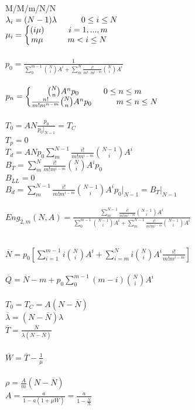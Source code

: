 \begin{minipage}{.22\textwidth}
	M/M/m/N/N \\
	$\lambda_i=(N-1)\lambda \hskip 3em 0\le{i}\le{N}$ \\
	$\mu_i = \left \{  \begin{matrix} (i\mu) \hskip 3em  i=1,...,m \\
			m\mu \hskip 3em m<i\le{N}\end{matrix}  \right .$ \\ \\
	$p_0=\frac{1}{\sum_0^{m-1}\binom{N}{i}A^i+\sum_m^N\frac{i!}{m!\cdot{m^{i-m}}}{\binom{N}{i}A^i}}$ \\ \\
	$p_n = \left \{  \begin{matrix} \binom{N}{n}A^n{p_0} \hskip 3em  0 \le {n} \le {m} \\
			\frac{n!}{m!m^{n-m}}\binom{N}{n}A^n{p_0} \hskip 3em m\le{n}\le{N}\end{matrix}  \right .$ \\ \\
	$T_0=AN\frac{p_0}{p_0|_{N-1}}=T_C$ \\
	$T_p=0$ \\
	$T_d=ANp_0\sum\limits_m^{N-1}\frac{i!}{m!{m^{i-m}}}\binom{N-1}{i}A^i$ \\
	$B_T=\sum\limits_m^{N}\frac{i!}{m!{m^{i-m}}}\binom{N}{i}A^i{p_0}$ \\
	$B_{LL}=0$ \\
	$B_d=\sum\limits_m^{N-1}\frac{i!}{m!{m^{i-m}}}\binom{N-1}{i}A^i{p_0|_{N-1}}=B_T|_{N-1}$\\ \\
	$Eng_{2,m}(N,A)=\frac{\sum\limits_m^{N-1}\frac{i!}{m!{m^{i-m}}}\binom{N-1}{i}A^i}{\sum\limits_0^{m-1}\binom{N-1}{i}A^i +\sum\limits_m^{N-1}\frac{i!}{m!{m^{i-m}}}\binom{N-1}{i}A^i}$ \\ \\
\end{minipage}
\vfill\null
\columnbreak
\begin{minipage}{.22\textwidth}
	$\overline{N}=p_0[\sum\limits_{i=1}^{m-1}{i}\binom{N}{i}A^i+\sum\limits_{i=m}^{N}{i}\binom{N}{i}A^i\frac{i!}{m!{m^{i-m}}}]$ \\ \\
	$\overline{Q}=\overline{N}-m+p_0\sum\limits_{0}^{m-1}(m-i)\binom{N}{i}A^i$ \\ \\
	$T_0=T_C=A(N-\overline{N})$ \\
	$\overline{\lambda}=(N-\overline{N})\lambda$ \\
	$\overline{T}=\frac{\overline{N}}{\lambda{(N-\overline{N})}}$ \\ \\
	$\overline{W}=\overline{T}-\frac{1}{\mu}$ \\ \\
	$\rho=\frac{A}{m}(N-\overline{N})$ \\
	$A=\frac{a}{1-a(1+\mu\overline{W})}=\frac{a}{1-\frac{\overline{N}}{N}}$ \\ \\
\end{minipage}


